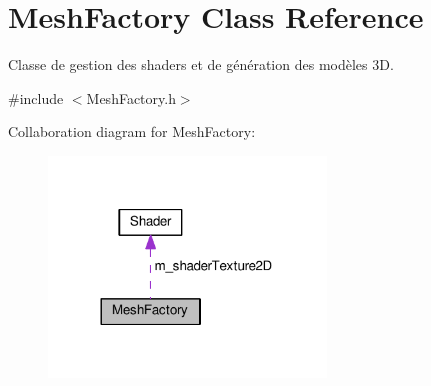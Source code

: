 \hypertarget{classMeshFactory}{\section{Mesh\+Factory Class Reference}
\label{classMeshFactory}
}


Classe de gestion des shaders et de génération des modèles 3\+D.  




{\ttfamily \#include $<$Mesh\+Factory.\+h$>$}



Collaboration diagram for Mesh\+Factory\+:\nopagebreak
\begin{figure}[H]
\begin{center}
\leavevmode
\includegraphics[width=209pt]{classMeshFactory__coll__graph}
\end{center}
\end{figure}
